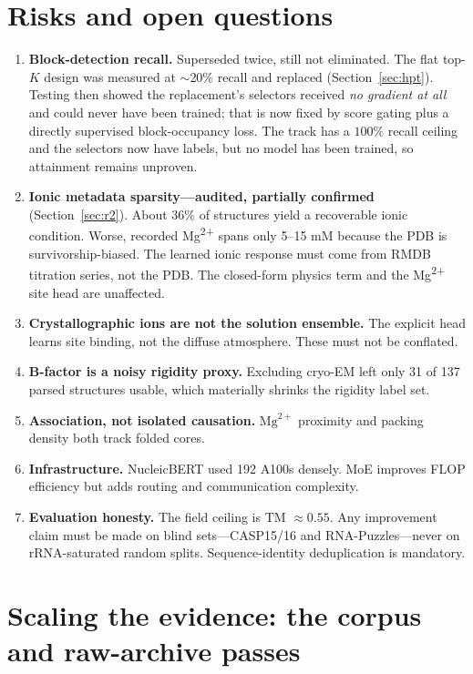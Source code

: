 \documentclass[11pt,a4paper]{article}
\begin{document}
\section{Risks and open questions}

\begin{enumerate}[leftmargin=1.4em,itemsep=0.25em]
\item \textbf{Block-detection recall.} Superseded twice, still not eliminated.
The flat top-$K$ design was measured at $\sim$20\% recall and replaced
(Section~\ref{sec:hpt}). Testing then showed the replacement's selectors received
\emph{no gradient at all} and could never have been trained; that is now fixed by
score gating plus a directly supervised block-occupancy loss. The track has a
$100\%$ recall ceiling and the selectors now have labels, but no model has been
trained, so attainment remains unproven.
\item \textbf{Ionic metadata sparsity---audited, partially confirmed}
(Section~\ref{sec:r2}). About $36\%$ of structures yield a recoverable ionic
condition. Worse, recorded Mg\textsuperscript{2+} spans only 5--15 mM because
the PDB is survivorship-biased. The learned ionic response must come from RMDB
titration series, not the PDB. The closed-form physics term and the
Mg\textsuperscript{2+} site head are unaffected.
\item \textbf{Crystallographic ions are not the solution ensemble.} The explicit
head learns site binding, not the diffuse atmosphere. These must not be
conflated.
\item \textbf{B-factor is a noisy rigidity proxy.} Excluding cryo-EM left only
31 of 137 parsed structures usable, which materially shrinks the rigidity label
set.
\item \textbf{Association, not isolated causation.} $\mathrm{Mg}^{2+}$ proximity
and packing density both track folded cores.
\item \textbf{Infrastructure.} NucleicBERT used 192 A100s densely. MoE improves
FLOP efficiency but adds routing and communication complexity.
\item \textbf{Evaluation honesty.} The field ceiling is TM $\approx 0.55$. Any
improvement claim must be made on blind sets---CASP15/16 and RNA-Puzzles---never
on rRNA-saturated random splits. Sequence-identity deduplication is mandatory.
\end{enumerate}

\section{Scaling the evidence: the corpus and raw-archive passes}
\label{sec:v02}
\end{document}
